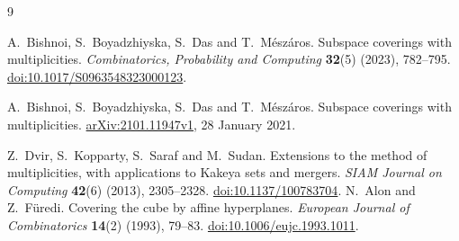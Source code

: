 \begin{thebibliography}{9}
\small
\setlength{\itemsep}{3pt}
\raggedright
{}
A.~Bishnoi, S.~Boyadzhiyska, S.~Das and T.~M\'esz\'aros.
\newblock Subspace coverings with multiplicities.
\newblock \emph{Combinatorics, Probability and Computing} \textbf{32}(5)
(2023), 782--795.
\newblock \href{https://doi.org/10.1017/S0963548323000123}{doi:10.1017/S0963548323000123}.

A.~Bishnoi, S.~Boyadzhiyska, S.~Das and T.~M\'esz\'aros.
\newblock Subspace coverings with multiplicities.
\newblock \href{https://arxiv.org/abs/2101.11947v1}{arXiv:2101.11947v1},
28 January 2021.

Z.~Dvir, S.~Kopparty, S.~Saraf and M.~Sudan.
\newblock Extensions to the method of multiplicities, with applications to
Kakeya sets and mergers.
\newblock \emph{SIAM Journal on Computing} \textbf{42}(6)
(2013), 2305--2328.
\newblock \href{https://doi.org/10.1137/100783704}{doi:10.1137/100783704}.
N.~Alon and Z.~F\"uredi.
\newblock Covering the cube by affine hyperplanes.
\newblock \emph{European Journal of Combinatorics} \textbf{14}(2)
(1993), 79--83.
\newblock \href{https://doi.org/10.1006/eujc.1993.1011}{doi:10.1006/eujc.1993.1011}.
\end{thebibliography}
